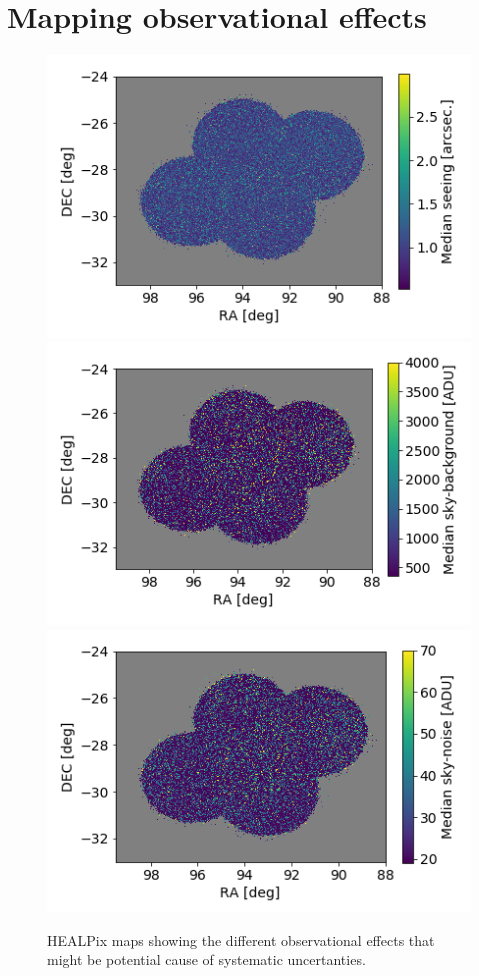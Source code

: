 \documentclass[twocolumn]{aastex62}
\begin{document}
\section{Mapping observational effects}
\label{sec:systematic_maps}
\begin{figure}
\centering
\includegraphics[width=0.7\columnwidth]{median_seeing.png}
\includegraphics[width=0.7\columnwidth]{median_skybg.png}
\includegraphics[width=0.7\columnwidth]{median_skynoise.png}
\caption{HEALPix maps showing the different observational effects that might be potential cause of systematic uncertanties.}
\label{fig:systematic_maps}
\end{figure}
\end{document}

